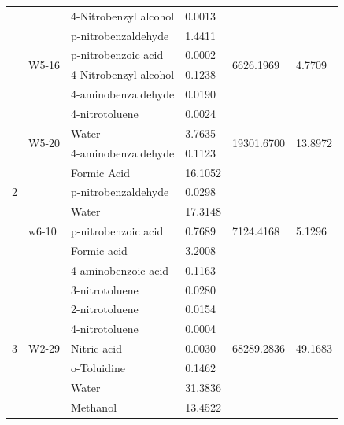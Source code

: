 \begin{table}[]
{\begin{tabular}{@{}llllll@{}}
 &  & 4-Nitrobenzyl alcohol & 0.0013 &  &  \\
 & \multirow{4}{*}{W5-16} & p-nitrobenzaldehyde & 1.4411 & \multirow{4}{*}{6626.1969} & \multirow{4}{*}{4.7709} \\
 &  & p-nitrobenzoic acid & 0.0002 &  &  \\
 &  & 4-Nitrobenzyl alcohol & 0.1238 &  &  \\
 &  & 4-aminobenzaldehyde & 0.0190 &  &  \\
\multirow{9}{*}{2} & \multirow{4}{*}{W5-20} & 4-nitrotoluene & 0.0024 & \multirow{4}{*}{19301.6700} & \multirow{4}{*}{13.8972} \\
 &  & Water & 3.7635 &  &  \\
 &  & 4-aminobenzaldehyde & 0.1123 &  &  \\
 &  & Formic Acid & 16.1052 &  &  \\
 & \multirow{5}{*}{w6-10} & p-nitrobenzaldehyde & 0.0298 & \multirow{5}{*}{7124.4168} & \multirow{5}{*}{5.1296} \\
 &  & Water & 17.3148 &  &  \\
 &  & p-nitrobenzoic acid & 0.7689 &  &  \\
 &  & Formic acid & 3.2008 &  &  \\
 &  & 4-aminobenzoic acid & 0.1163 &  &  \\
\multirow{7}{*}{3} & \multirow{7}{*}{W2-29} & 3-nitrotoluene & 0.0280 & \multirow{7}{*}{68289.2836} & \multirow{7}{*}{49.1683} \\
 &  & 2-nitrotoluene & 0.0154 &  &  \\
 &  & 4-nitrotoluene & 0.0004 &  &  \\
 &  & Nitric acid & 0.0030 &  &  \\
 &  & o-Toluidine & 0.1462 &  &  \\
 &  & Water & 31.3836 &  &  \\
 &  & Methanol & 13.4522 &  &  \\ \cmidrule(lr){3-4}
\end{tabular}%
}
\end{table}

